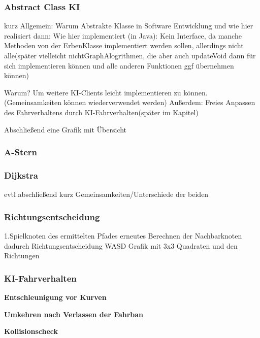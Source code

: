 \subsubsection{Abstract Class KI}

kurz Allgemein: Warum Abstrakte Klasse in Software Entwicklung und wie hier realisiert\newline
dann: Wie hier implementiert (in Java): Kein Interface, da manche Methoden von der ErbenKlasse implementiert werden sollen, allerdings nicht alle(später vielleicht nichtGraphAlogrithmen, die aber auch updateVoid dann für sich implementieren können und alle anderen Funktionen ggf übernehmen können)


Warum? Um weitere KI-Clients leicht implementieren zu können.(Gemeinsamkeiten können wiederverwendet werden) \newline
Außerdem: Freies Anpassen des Fahrverhaltens durch KI-Fahrverhalten(später im Kapitel)

Abschließend eine Grafik mit Übersicht

\subsubsection{A-Stern}

\subsubsection{Dijkstra}

evtl abschließend kurz Gemeinsamkeiten/Unterschiede der beiden

\subsubsection{Richtungsentscheidung}

1.Spielknoten des ermittelten Pfades\newline
erneutes Berechnen der Nachbarknoten\newline
dadurch Richtungsentscheidung WASD\newline
Grafik mit 3x3 Quadraten und den Richtungen\newline


\subsubsection{KI-Fahrverhalten}

\textbf{Entschleunigung vor Kurven}

\textbf{Umkehren nach Verlassen der Fahrban}

\textbf{Kollisionscheck}